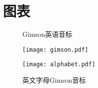 \chapter{图表}

\begin{figure}[htbp!]
  \centering
  \caption{\label{fig:gimson}Gimson英语音标}
  \texttt{[image: gimson.pdf]}

  \bigskip

  \caption{\label{fig:alphabet}英文字母Gimson音标}
  \texttt{[image: alphabet.pdf]}

\end{figure}


\twocolumn



